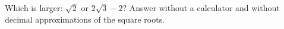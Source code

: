 Which is larger: $\sqrt2$ or $2\sqrt3-2$? Answer without a calculator and without decimal approximations of the square roots.
